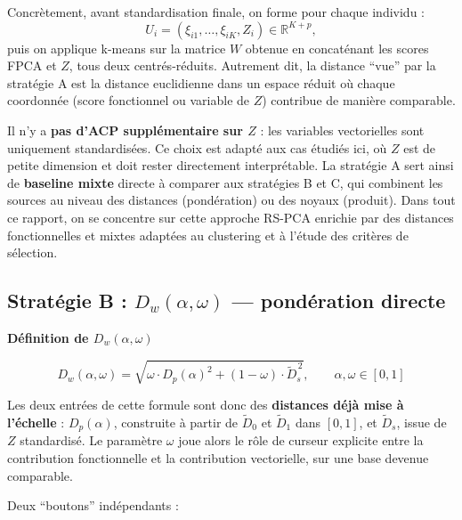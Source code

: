 \documentclass[11pt, a4paper]{article}
\newcommand{\R}{\mathbb{R}}
\newcommand{\Dp}{D_p}
\newcommand{\Dw}{D_w}
\newenvironment{keybox}[1][]{%
  \def\FrameCommand{\fboxsep=8pt \fcolorbox{emphborder}{emphbox}}%
  \MakeFramed{\advance\hsize-\width \FrameRestore}%
  \noindent\textbf{#1}\par\smallskip\noindent\ignorespaces
}{\endMakeFramed}
\begin{document}
Concrètement, avant standardisation finale, on forme pour chaque
individu :
\[
  U_i = (\xi_{i1}, \ldots, \xi_{iK}, Z_i) \in \R^{K+p},
\]
puis on applique k-means sur la matrice $W$ obtenue en concaténant les
scores FPCA et $Z$, tous deux centrés-réduits. Autrement dit, la
distance ``vue'' par la stratégie A est la distance euclidienne dans un
espace réduit où chaque coordonnée (score fonctionnel ou variable de
$Z$) contribue de manière comparable.

Il n'y a \textbf{pas d'ACP supplémentaire sur $Z$} : les variables
vectorielles sont uniquement standardisées. Ce choix est adapté aux cas
étudiés ici, où $Z$ est de petite dimension et doit rester directement
interprétable. La stratégie A sert ainsi de \textbf{baseline mixte}
directe à comparer aux stratégies B et C, qui combinent les sources au
niveau des distances (pondération) ou des noyaux (produit). Dans tout
ce rapport, on se concentre sur cette approche RS-PCA enrichie par des
distances fonctionnelles et mixtes adaptées au clustering et à l'étude
des critères de sélection.

\subsection{Stratégie B : $\Dw(\alpha, \omega)$ — pondération directe}

\begin{keybox}[Définition de $\Dw(\alpha, \omega)$]
\[
  \Dw(\alpha, \omega) = \sqrt{\omega \cdot \Dp(\alpha)^2
  + (1 - \omega) \cdot \tilde{D}_s^{\,2}},
  \qquad \alpha, \omega \in [0, 1]
\]
\end{keybox}

Les deux entrées de cette formule sont donc des \textbf{distances déjà
mise à l'échelle} : $\Dp(\alpha)$, construite à partir de $\tilde{D}_0$
et $\tilde{D}_1$ dans $[0,1]$, et $\tilde{D}_s$, issue de $Z$
standardisé. Le paramètre $\omega$ joue alors le rôle de curseur
explicite entre la contribution fonctionnelle et la contribution
vectorielle, sur une base devenue comparable.

Deux ``boutons'' indépendants :
\end{document}
